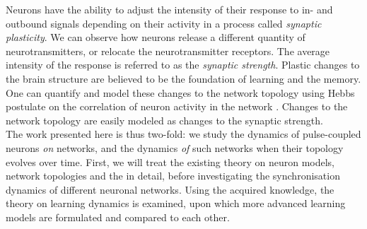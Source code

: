 Neurons have the ability to adjust the intensity of their response to in- and outbound signals depending on their activity in a process called \textsl{synaptic plasticity}. We can observe how neurons release a different quantity of neurotransmitters, or relocate the neurotransmitter receptors. The average intensity of the response is referred to as the \textsl{synaptic strength}. Plastic changes to the brain structure are believed to be the foundation of learning and the memory. One can quantify and model these changes to the network topology using Hebbs postulate on the correlation of neuron activity in the network \cite{Hebb1949}. Changes to the network topology are easily modeled as changes to the synaptic strength.\\

The work presented here is thus two-fold:  we study the dynamics of pulse-coupled neurons \textsl{on} networks, and the dynamics \textsl{of} such networks when their topology evolves over time. First, we will treat the existing theory on neuron models, network topologies and the \MFR in detail, before investigating the synchronisation dynamics of different neuronal networks. Using the acquired knowledge, the theory on learning dynamics is examined, upon which more advanced learning models are formulated and compared to each other.

